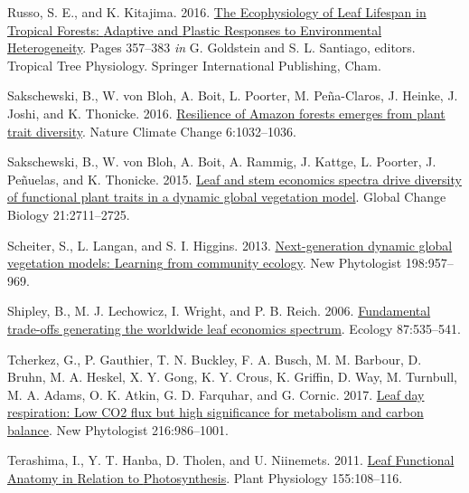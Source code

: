 \documentclass[
  12pt,
]{article}
\begin{document}
\begin{CSLReferences}{1}{0}
\leavevmode{}%
Russo, S. E., and K. Kitajima. 2016. \href{https://doi.org/10.1007/978-3-319-27422-5_17}{The {Ecophysiology} of {Leaf Lifespan} in {Tropical Forests}: {Adaptive} and {Plastic Responses} to {Environmental Heterogeneity}}. Pages 357--383 \emph{in} G. Goldstein and S. L. Santiago, editors. Tropical {Tree Physiology}. {Springer International Publishing}, {Cham}.

\leavevmode{}%
Sakschewski, B., W. von Bloh, A. Boit, L. Poorter, M. Peña-Claros, J. Heinke, J. Joshi, and K. Thonicke. 2016. \href{https://doi.org/10.1038/nclimate3109}{Resilience of {Amazon} forests emerges from plant trait diversity}. Nature Climate Change 6:1032--1036.

\leavevmode{}%
Sakschewski, B., W. von Bloh, A. Boit, A. Rammig, J. Kattge, L. Poorter, J. Peñuelas, and K. Thonicke. 2015. \href{https://doi.org/10.1111/gcb.12870}{Leaf and stem economics spectra drive diversity of functional plant traits in a dynamic global vegetation model}. Global Change Biology 21:2711--2725.

\leavevmode{}%
Scheiter, S., L. Langan, and S. I. Higgins. 2013. \href{https://doi.org/10.1111/nph.12210}{Next-generation dynamic global vegetation models: {Learning} from community ecology}. New Phytologist 198:957--969.

\leavevmode{}%
Shipley, B., M. J. Lechowicz, I. Wright, and P. B. Reich. 2006. \href{https://doi.org/10.1890/05-1051}{Fundamental trade-offs generating the worldwide leaf economics spectrum}. Ecology 87:535--541.

\leavevmode{}%
Tcherkez, G., P. Gauthier, T. N. Buckley, F. A. Busch, M. M. Barbour, D. Bruhn, M. A. Heskel, X. Y. Gong, K. Y. Crous, K. Griffin, D. Way, M. Turnbull, M. A. Adams, O. K. Atkin, G. D. Farquhar, and G. Cornic. 2017. \href{https://doi.org/10.1111/nph.14816}{Leaf day respiration: Low {CO2} flux but high significance for metabolism and carbon balance}. New Phytologist 216:986--1001.

\leavevmode{}%
Terashima, I., Y. T. Hanba, D. Tholen, and U. Niinemets. 2011. \href{https://doi.org/10.1104/pp.110.165472}{Leaf {Functional Anatomy} in {Relation} to {Photosynthesis}}. Plant Physiology 155:108--116.


\end{CSLReferences}
\end{document}
